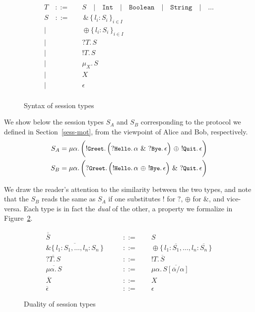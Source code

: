 \documentclass[a4paper,twoside]{article}
\newcommand{\RefSec}[1]{Section~\ref{#1}}
\newcommand{\RefFig}[1]{Figure~\ref{#1}}
\newcommand{\stt}[1]{\texttt{\small{#1}}}
\begin{document}
\begin{figure}
\begin{align*}
T\quad::=&\quad 	S
   \quad|\quad \texttt{Int}
   \quad|\quad \texttt{Boolean}
   \quad|\quad \texttt{String}
   \quad|\quad \ldots \tag*{payload}
\\
S\quad::=&\quad 	\,\&\,\{\,l_i: S_i\,\}_{i\in I}			\tag*{branching}\\
        |&\quad 	\oplus\{\,l_i: S_i\,\}_{i\in I}			\tag*{selection}\\
		|&\quad 	?T.\, S									\tag*{receive}\\
		|&\quad 	!T.\, S									\tag*{send}\\
        |&\quad		\mu_X.\, S								\tag*{recursion}\\
        |&\quad 	X  										\tag*{variable}\\
        |&\quad 	\epsilon								\tag*{termination}\\
\end{align*}
\vspace{-20pt}
\caption{Syntax of session types \label{fig:sess-syntax}}
\end{figure}

We show below the session types $S_A$ and $S_B$ corresponding to the protocol we defined in \RefSec{sess-mot}, from the viewpoint of Alice and Bob, respectively.
\begin{align*}
S_A &= \mu\alpha.\,\bigg(!\stt{Greet}.\,\Big(?\stt{Hello}.\,\alpha\ \&\ ?\stt{Bye}.\, \epsilon \Big)\ \oplus\ !\stt{Quit}.\,\epsilon \bigg)\\
S_B &= \mu\alpha.\,\bigg(?\stt{Greet}.\,\Big(!\stt{Hello}.\,\alpha\ \oplus\ !\stt{Bye}.\, \epsilon \Big)\ \&\ ?\stt{Quit}.\,\epsilon \bigg)\\
\end{align*}
\vspace{-30pt}

We draw the reader's attention to the similarity between the two types, and note that the $S_B$ reads the same as $S_A$ if one substitutes $!$ for $?$, $\oplus$ for $\&$, and vice-versa. Each type is in fact the \textit{dual} of the other, a property we formalize in \RefFig{fig:dual}.\\

\begin{figure}
{\large
\begin{align*}
\overline{\overline{S}}\qquad&::=\qquad S\\
\overline{\&\{\,l_1: S_1, \ldots, l_n: S_n\,\}}\qquad&::=\qquad\oplus\{\,l_1: \overline{S_1}, \ldots, l_n: \overline{S_n}\,\}\\
\overline{?T.\, S} \qquad&::=\qquad !T.\, \overline{S}\\
\overline{\mu\alpha.\, S} \qquad&::=\qquad \mu\alpha.\, \overline{S[\overline{\alpha}/\alpha]}\\
\overline{X} \qquad&::=\qquad X\\
\overline{\epsilon} \qquad&::=\qquad \epsilon
\end{align*}
}%
\vspace{-20pt}
\caption{Duality of session types \label{fig:dual}}
\end{figure}
\end{document}
